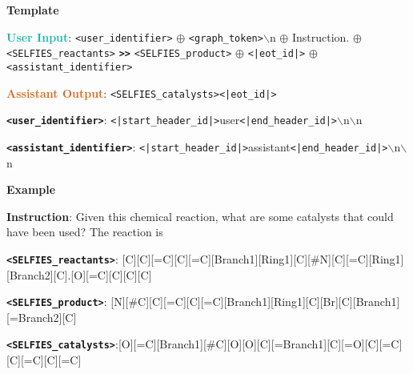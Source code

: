 \begin{tcolorbox}[colback=white!98!black,colframe=white!30!black,boxsep=1.1pt,top=6.75pt]%
\scriptsize
\noindent\makebox[\textwidth]{\rule{\textwidth}{1pt}}
\textbf{Template}
\\[-0.575em]
\noindent\makebox[\textwidth]{\rule{\textwidth}{1pt}}

\textbf{\textcolor[HTML]{20B2AA}{User Input}}: {\tt <user\_identifier>} $\oplus$ {\tt <graph\_token>}$\backslash$n $\oplus$ Instruction. $\oplus$ {\tt <SELFIES\_reactants>} {\tt \textbf{>>}} {\tt <SELFIES\_product>} $\oplus$ {\tt <|eot\_id|>} $\oplus$ {\tt <assistant\_identifier>}

\textbf{\textcolor[HTML]{D2691E}{Assistant Output}}: {\tt <SELFIES\_catalysts>}{\tt <|eot\_id|>}

{\tt \textbf{<user\_identifier>}}: {\tt <|start\_header\_id|>}user{\tt <|end\_header\_id|>}$\backslash$n$\backslash$n

{\tt \textbf{<assistant\_identifier>}}: {\tt <|start\_header\_id|>}assistant{\tt <|end\_header\_id|>}$\backslash$n$\backslash$n

\noindent\makebox[\textwidth]{\rule{\textwidth}{1pt}}
\textbf{Example}
\\[-0.575em]
\noindent\makebox[\textwidth]{\rule{\textwidth}{1pt}}

\begin{tcolorbox}[colback=cyan!7!white,colframe=white!98!black,boxsep=1.1pt,top=6.75pt]
\textbf{Instruction}: Given this chemical reaction, what are some catalysts that could have been used? The reaction is

{\tt \textbf{<SELFIES\_reactants>}}: 
[C][C][=C][C][=C][Branch1][Ring1][C][\#N][C][=C][Ring1][Branch2][C]\-[Branch1][C][F][Branch1][C][F][F].[O][=C][C][C][C]\-[=Branch1][C][=O][N]\-[Ring1][=Branch1][Br]

{\tt \textbf{<SELFIES\_product>}}: 
[N][\#C][C][=C][C][=C][Branch1][Ring1][C][Br][C][Branch1][=Branch2][C]\-[Branch1][C][F][Branch1][C][F][F][=C][Ring1][N]
\end{tcolorbox}

\begin{tcolorbox}[colback=orange!7!white,colframe=white!98!black,boxsep=1.1pt,top=6.75pt]
{\tt \textbf{<SELFIES\_catalysts>}}:[O][=C][Branch1][\#C][O][O][C][=Branch1][C][=O][C][=C][C][=C][C][=C]\-[Ring1][=Branch1][C][=C][C][=C][C] [=C][Ring1][=Branch1]
\end{tcolorbox}

\end{tcolorbox}


